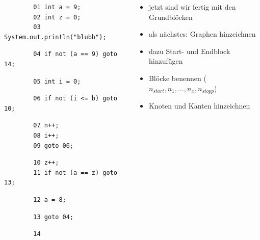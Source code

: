 \documentclass[18pt]{beamer}
\begin{document}
	\begin{frame}[fragile]
\small 
\begin{columns}
	\begin{column}{0.4\textwidth}
		\scriptsize
		\begin{verbatim}
		01 int a = 9;
		02 int z = 0;
		03 System.out.println("blubb");
		\end{verbatim}
		\begin{verbatim}
		04 if not (a == 9) goto 14;
		\end{verbatim}
		\begin{verbatim}
		05 int i = 0;
		\end{verbatim}
		\begin{verbatim}
		06 if not (i <= b) goto 10;
		\end{verbatim}
		\begin{verbatim}
		07 n++;
		08 i++;
		09 goto 06;
		\end{verbatim}
		\begin{verbatim}
		10 z++;
		11 if not (a == z) goto 13;
		\end{verbatim}
		\begin{verbatim}
		12 a = 8;
		\end{verbatim}
		\begin{verbatim}
		13 goto 04;
		\end{verbatim}
		\begin{verbatim}
		14
		\end{verbatim}
	\end{column}%
	\begin{column}{0.6\textwidth}
		\begin{itemize}
			\pause
			\item jetzt sind wir fertig mit den Grundblöcken
			\pause
			\item als nächstes: Graphen hinzeichnen
			\item dazu Start- und Endblock hinzufügen
			\item Blöcke benennen ($n_{start}, n_1, \dots, n_x, n_{stopp}$)
			\item Knoten und Kanten hinzeichnen
		\end{itemize}
	\end{column}
\end{columns}	
\end{frame}
\end{document}
